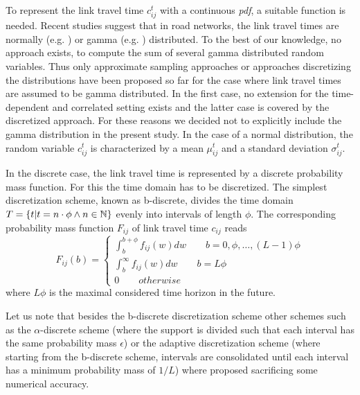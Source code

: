 To represent the link travel time $c_{ij}^t$ with a continuous \textit{pdf}, a
suitable function is needed. Recent studies suggest that in road networks, the link
travel times are normally (e.g. \cite{Seshadri10}) or gamma
(e.g. \cite{Zockaei13}) distributed. To the best of our knowledge, no
approach exists, to compute the sum of several gamma distributed random
variables. Thus only approximate sampling approaches \cite{Zockaei13} or approaches discretizing the distributions \cite{Nie09b} have been proposed so far for the case where link travel times are assumed to be gamma distributed. In the first case, no extension for the time-dependent and correlated setting
exists and the latter case is covered by the discretized approach. For these
reasons we decided not to explicitly include the gamma distribution in the
present study. In the case of a normal distribution, the random variable
$c_{ij}^t$ is characterized by a mean $\mu_{ij}^t$ and a standard deviation $\sigma_{ij}^t$.

In the discrete case, the link travel time is represented by a discrete
probability mass function. For this the time domain has to be discretized.
The simplest discretization scheme, known as b-discrete, divides the time domain
$T = \{t | t = n\cdot \phi \wedge n \in \mathbb{N} \}$ evenly into intervals of length $\phi$.
The corresponding probability mass function $F_{ij}$ of link travel time
$c_{ij}$ reads
\begin{equation}
	F_{ij}(b) = \begin{cases}\int_b^{b+\phi}f_{ij}(w)dw \qquad b =
	0,\phi,\ldots, (L-1)\phi\\
	\int_b^{\infty}f_{ij}(w)dw \qquad b =
	L \phi\\
	0 \qquad otherwise
	\end{cases} 
\end{equation}
where $L \phi$ is the maximal considered time horizon in the future.

Let us note that besides the b-discrete discretization scheme other schemes
\cite{Nie12} such as the $\alpha$-discrete scheme (where the support
is divided such that each interval has the same probability mass $\epsilon$) or
the adaptive discretization scheme (where starting from the b-discrete scheme,
intervals are consolidated until each interval has a minimum probability mass of
$1/L$) where proposed sacrificing some numerical accuracy.


